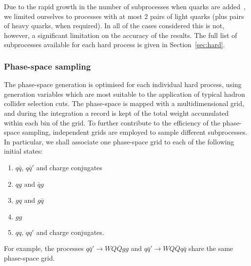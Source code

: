 \documentclass[paper]{JHEP3}
\def    \qbar   {\bar{q}}
\def    \Qbar   {\overline{Q}}
\begin{document}
Due to the rapid growth in the number of subprocesses when quarks are
added~\cite{Draggiotis:2000sh}, we limited ourselves to processes with
at most 2 pairs of light quarks (plus pairs of heavy quarks, when
required). In all of the cases considered this is not, however, a
significant limitation on the accuracy of the results.  The full list
of subprocesses available for each hard process is given in
Section~\ref{sec:hard}.

\subsubsection{Phase-space sampling}
The phase-space generation is optimised for each individual hard
process, using generation variables which are most suitable to the
application of typical hadron collider selection cuts.  The
phase-space is mapped with a multidimensional grid, and during the
integration a record is kept of the total weight accumulated within
each bin of the grid.  To further contribute to the efficiency of the
phase-space sampling, independent grids are employed to sample
different subprocesses. In particular, we shall associate one
phase-space grid to each of the following initial states:
\begin{enumerate}
\item $q\qbar$, $q\qbar'$ and charge conjugates
\item $qg$ and $\qbar g$
\item $gq$ and $g \qbar$
\item $gg$
\item $qq$, $qq'$ and  charge conjugates.
\end{enumerate}
For example, the processes $q \qbar'  \to WQ\Qbar  gg$ and 
 $q \qbar'  \to WQ\Qbar  q \qbar$ share the same phase-space
 grid.
 
\end{document}
